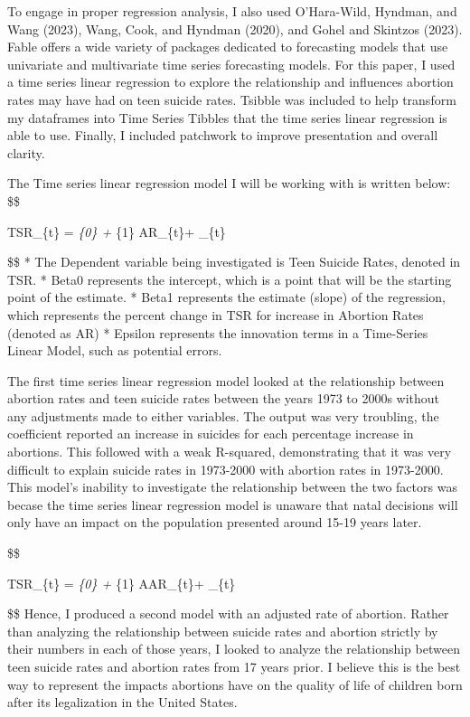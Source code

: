 \documentclass[
  letterpaper,
  DIV=11,
  numbers=noendperiod]{scrartcl}
\begin{document}
To engage in proper regression analysis, I also used O'Hara-Wild,
Hyndman, and Wang (2023), Wang, Cook, and Hyndman (2020), and Gohel and
Skintzos (2023). Fable offers a wide variety of packages dedicated to
forecasting models that use univariate and multivariate time series
forecasting models. For this paper, I used a time series linear
regression to explore the relationship and influences abortion rates may
have had on teen suicide rates. Tsibble was included to help transform
my dataframes into Time Series Tibbles that the time series linear
regression is able to use. Finally, I included patchwork to improve
presentation and overall clarity.

The Time series linear regression model I will be working with is
written below: \$\$

TSR\_\{t\} = \beta\emph{\{0\} + \beta}\{1\} AR\_\{t\}+ \epsilon\_\{t\}

\$\$ * The Dependent variable being investigated is Teen Suicide Rates,
denoted in TSR. * Beta0 represents the intercept, which is a point that
will be the starting point of the estimate. * Beta1 represents the
estimate (slope) of the regression, which represents the percent change
in TSR for increase in Abortion Rates (denoted as AR) * Epsilon
represents the innovation terms in a Time-Series Linear Model, such as
potential errors.

The first time series linear regression model looked at the relationship
between abortion rates and teen suicide rates between the years 1973 to
2000s without any adjustments made to either variables. The output was
very troubling, the coefficient reported an increase in suicides for
each percentage increase in abortions. This followed with a weak
R-squared, demonstrating that it was very difficult to explain suicide
rates in 1973-2000 with abortion rates in 1973-2000. This model's
inability to investigate the relationship between the two factors was
becase the time series linear regression model is unaware that natal
decisions will only have an impact on the population presented around
15-19 years later.

\$\$

TSR\_\{t\} = \beta\emph{\{0\} + \beta}\{1\} AAR\_\{t\}+ \epsilon\_\{t\}

\$\$ Hence, I produced a second model with an adjusted rate of abortion.
Rather than analyzing the relationship between suicide rates and
abortion strictly by their numbers in each of those years, I looked to
analyze the relationship between teen suicide rates and abortion rates
from 17 years prior. I believe this is the best way to represent the
impacts abortions have on the quality of life of children born after its
legalization in the United States.
\end{document}
